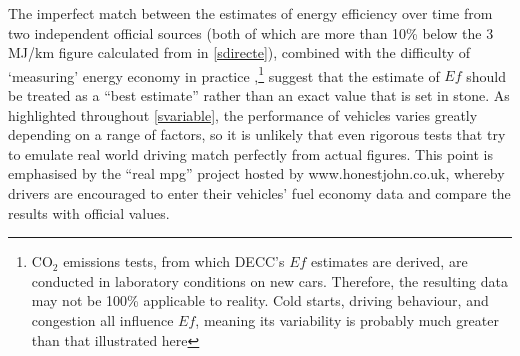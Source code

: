 The imperfect match between the estimates of energy efficiency over
time from two independent official sources (both of which are
more than 10\% below the 3 MJ/km figure calculated from
\citet{Defra2011} in \cref{sdirecte}), combined with the difficulty of `measuring'
energy economy in
practice
\citep{Schipper1993},\footnote{CO$_2$
emissions tests, from which
DECC's $Ef$ estimates are derived, are conducted in laboratory conditions on
new cars. Therefore, the resulting data may not be 100\% applicable to reality.
Cold starts, driving behaviour, and congestion all influence $Ef$, meaning its
variability is probably much greater than that illustrated here
}
suggest that
the \citet{Decc2011t} estimate of $Ef$ should be treated as a ``best estimate''
rather than an exact value that is set in stone. As highlighted throughout
\cref{svariable}, the performance of vehicles varies greatly depending
on a range of factors, so it is unlikely that even rigorous tests that
try to emulate real world driving match perfectly from actual figures.
This point is emphasised by the ``real mpg'' project hosted by
www.honestjohn.co.uk, whereby drivers are encouraged to enter their
vehicles' fuel economy data and compare the results with official values.


